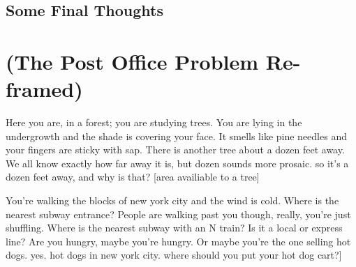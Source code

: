 \documentclass[12pt,twoside]{reedthesis}
\begin{document}
      \clearpage

  
  \section{Some Final Thoughts} %
  \label{sec:some_final_thoughts}


\appendix
  \chapter{(The Post Office Problem Re-framed)}
  \label{appendix_one}
  Here you are, in a forest; you are studying trees. You are lying in the undergrowth and the shade is covering your face. It smells like pine needles and your fingers are sticky with sap. There is another tree about a dozen feet away. We all know exactly how far away it is, but dozen sounds more prosaic. so it's a dozen feet away, and why is that? [area availiable to a tree]\par
  You're walking the blocks of new york city and the wind is cold. Where is the nearest subway entrance? People are walking past you though, really, you're just shuffling. Where is the nearest subway with an N train? Is it a local or express line? Are you hungry, maybe you're hungry. Or maybe you're the one selling hot dogs. yes. hot dogs in new york city. where should you put your hot dog cart?] 
\backmatter
% 

\end{document}
